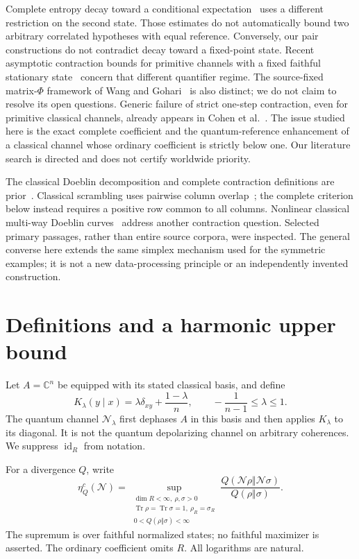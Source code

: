 \documentclass[11pt]{article}
\theoremstyle{remark}\newtheorem{remark}[theorem]{Remark}
\newcommand{\Tr}{\operatorname{Tr}}
\newcommand{\id}{\operatorname{id}}
\newcommand{\N}{\mathcal N}
\begin{document}
Complete entropy decay toward a conditional expectation~\cite{GR,GJLL} uses a different restriction on the second state. Those estimates do not automatically bound two arbitrary correlated hypotheses with equal reference. Conversely, our pair constructions do not contradict decay toward a fixed-point state. Recent asymptotic contraction bounds for primitive channels with a fixed faithful stationary state~\cite{TTG} concern that different quantifier regime. The source-fixed matrix-$\Phi$ framework of Wang and Gohari~\cite{WG} is also distinct; we do not claim to resolve its open questions. Generic failure of strict one-step contraction, even for primitive classical channels, already appears in Cohen et al.~\cite{Cohen}. The issue studied here is the exact complete coefficient and the quantum-reference enhancement of a classical channel whose ordinary coefficient is strictly below one. Our literature search is directed and does not certify worldwide priority.

The classical Doeblin decomposition and complete contraction definitions are prior~\cite{GHNW,HGNW}. Classical scrambling uses pairwise column overlap~\cite{Cohen}; the complete criterion below instead requires a positive row common to all columns. Nonlinear classical multi-way Doeblin curves~\cite{DC} address another contraction question. Selected primary passages, rather than entire source corpora, were inspected. The general converse here extends the same simplex mechanism used for the symmetric examples; it is not a new data-processing principle or an independently invented construction.

\section{Definitions and a harmonic upper bound}
Let $A=\mathbb C^n$ be equipped with its stated classical basis, and define
\begin{equation}\label{eq:channel}
 K_\lambda(y\mid x)=\lambda\delta_{xy}+\frac{1-\lambda}{n},
 \qquad -\frac1{n-1}\leq\lambda\leq1.
\end{equation}
The quantum channel $\N_\lambda$ first dephases $A$ in this basis and then applies $K_\lambda$ to its diagonal. It is not the quantum depolarizing channel on arbitrary coherences. We suppress $\id_R$ from notation.

For a divergence $Q$, write
\begin{equation}\label{eq:complete}
 \eta_Q^c(\N)=\sup_{\substack{\dim R<\infty,\ \rho,\sigma>0\\
 \Tr\rho=\Tr\sigma=1,\ \rho_R=\sigma_R\\0<Q(\rho\Vert\sigma)<\infty}}
 \frac{Q(\N\rho\Vert\N\sigma)}{Q(\rho\Vert\sigma)}.
\end{equation}
The supremum is over faithful normalized states; no faithful maximizer is asserted. The ordinary coefficient omits $R$. All logarithms are natural.
\end{document}
